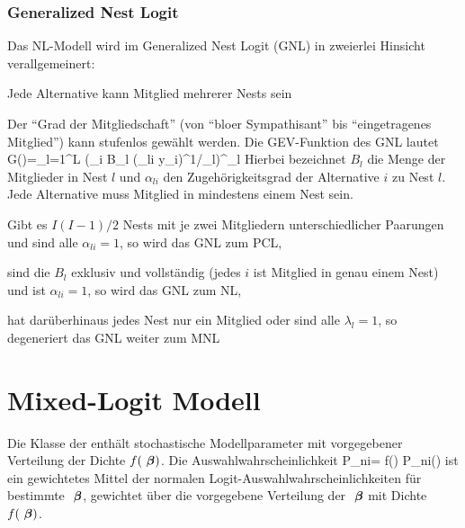 \subsubsection{Generalized Nest Logit }
Das NL-Modell wird im Generalized Nest Logit (GNL) in zweierlei Hinsicht verallgemeinert:
\bi
\item Jede Alternative kann Mitglied mehrerer Nests sein
\item Der ``Grad der Mitgliedschaft'' (von ``blo\3er Sympathisant''
  bis ``eingetragenes Mitglied'') kann stufenlos gew\"ahlt werden. 
\ei
Die GEV-Funktion des GNL lautet
\be
\label{GNL-G}
G()=\sum_{l=1}^L 
 \left(\sum_{i \in B_l} (\alpha_{li} y_i)^{1/\lambda_l}\right)^{\lambda_l}
\ee
Hierbei bezeichnet $B_l$ die Menge der Mitglieder in
Nest $l$  und  $\alpha_{li}$ den
Zugeh\"origkeitsgrad der 
Alternative $i$ zu Nest $l$. Jede Alternative muss Mitglied in mindestens einem Nest sein.
\bi
\item Gibt es $I(I-1)/2$ Nests mit je zwei Mitgliedern
  unterschiedlicher Paarungen und sind alle $\alpha_{li}=1$, so wird das GNL
  zum PCL,
\item sind die $B_l$ exklusiv und vollst\"andig (jedes $i$ ist
  Mitglied in genau einem Nest) und ist $\alpha_{li}=1$, so wird das GNL
  zum NL,
\item hat dar\"uberhinaus jedes Nest nur ein Mitglied oder sind alle
  $\lambda_l=1$, so degeneriert das GNL weiter zum MNL
\ei


\section{\label{sec:mixed} Mixed-Logit Modell}
\EinsteinBeg

\providecommand{\vectheta}{\vec{\theta}}

Die Klasse der   enth\"alt stochastische
Modellparameter mit vorge\-ge\-bener Verteilung der Dichte
$f({\mbox{ \boldmath {$\beta$}}})$.
 Die Auswahlwahrscheinlichkeit 
\be
\label{P-MILO}
P_{ni}=\int\!\! \diff{\vecbeta} f(\vecbeta) P_{ni}(\vecbeta)
\ee
ist ein gewichtetes Mittel der normalen
Logit-Auswahlwahrscheinlichkeiten f\"ur bestimmte ${\mbox{ \boldmath {$\beta$}}}$,
gewichtet \"uber die vorgegebene Verteilung der ${\mbox{ \boldmath {$\beta$}}}$  mit Dichte
$f({\mbox{ \boldmath {$\beta$}}})$.

